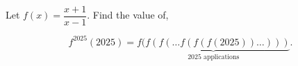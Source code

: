 Let $f(x) = \dfrac{x+1}{x-1}$. Find the value of,

\[
f^{2025}(2025) = \underbrace{f(f(f(\dots f(f(f(2025))\dots)))}_{2025 \text{ applications}}.
\]
